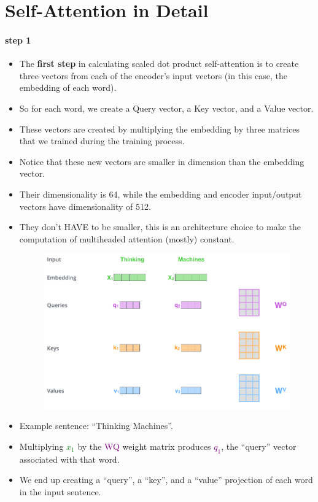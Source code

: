 \section{Self-Attention in Detail}


\paragraph{step 1}

\begin{itemize}
\item The \textbf{first step} in calculating scaled dot product self-attention is to create three vectors from each of the encoder's input vectors (in this case, the embedding of each word).

\item So for each word, we create a Query vector, a Key vector, and a Value vector.

\item These vectors are created by multiplying the embedding by three matrices that we trained during the training process.

\item Notice that these new vectors are smaller in dimension than the embedding vector. 

\item Their dimensionality is 64, while the embedding and encoder input/output vectors have dimensionality of 512. 

\item They don’t HAVE to be smaller, this is an architecture choice to make the computation of multiheaded attention (mostly) constant.


\begin{figure}[h]
        	\includegraphics[scale = 0.3]{pics/transformer_self_attention_vectors.png}
        \end{figure}  
      
\item Example sentence: ``Thinking Machines''.
\item Multiplying \textcolor{green}{$x_1$} by the \textcolor{purple}{WQ} weight matrix produces \textcolor{purple}{$q_1$}, the ``query'' vector associated with that word.
\item We end up creating a ``query'', a ``key'', and a ``value'' projection of each word in the input sentence.

\end{itemize}


